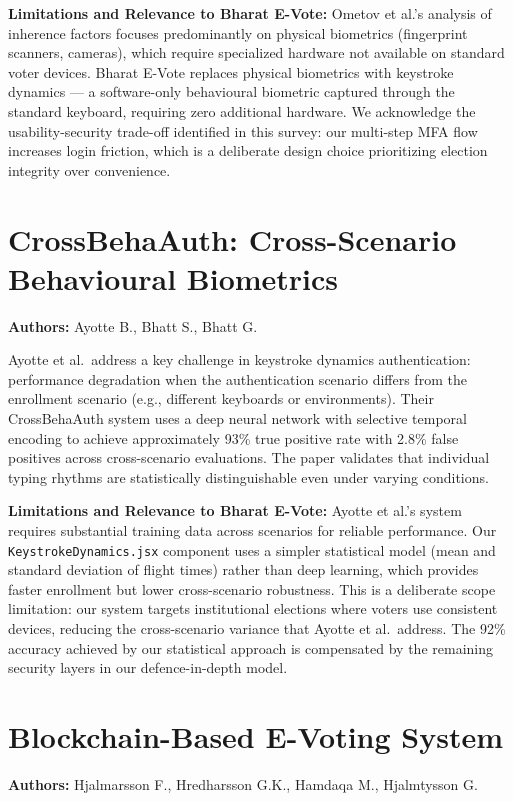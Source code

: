 \documentclass[oneside,a4paper,12pt]{book}
\begin{document}
\textbf{Limitations and Relevance to Bharat E-Vote:} Ometov et al.'s analysis of inherence factors focuses predominantly on physical biometrics (fingerprint scanners, cameras), which require specialized hardware not available on standard voter devices. Bharat E-Vote replaces physical biometrics with keystroke dynamics --- a software-only behavioural biometric captured through the standard keyboard, requiring zero additional hardware. We acknowledge the usability-security trade-off identified in this survey: our multi-step MFA flow increases login friction, which is a deliberate design choice prioritizing election integrity over convenience.

\section{CrossBehaAuth: Cross-Scenario Behavioural Biometrics}
\textbf{Authors:} Ayotte B., Bhatt S., Bhatt G. \cite{ayotte2023}

Ayotte et al.\ address a key challenge in keystroke dynamics authentication: performance degradation when the authentication scenario differs from the enrollment scenario (e.g., different keyboards or environments). Their CrossBehaAuth system uses a deep neural network with selective temporal encoding to achieve approximately 93\% true positive rate with 2.8\% false positives across cross-scenario evaluations. The paper validates that individual typing rhythms are statistically distinguishable even under varying conditions.

\textbf{Limitations and Relevance to Bharat E-Vote:} Ayotte et al.'s system requires substantial training data across scenarios for reliable performance. Our \texttt{KeystrokeDynamics.jsx} component uses a simpler statistical model (mean and standard deviation of flight times) rather than deep learning, which provides faster enrollment but lower cross-scenario robustness. This is a deliberate scope limitation: our system targets institutional elections where voters use consistent devices, reducing the cross-scenario variance that Ayotte et al.\ address. The 92\% accuracy achieved by our statistical approach is compensated by the remaining security layers in our defence-in-depth model.

\section{Blockchain-Based E-Voting System}
\textbf{Authors:} Hjalmarsson F., Hredharsson G.K., Hamdaqa M., Hjalmtysson G. \cite{hjalmarsson2018}
\end{document}
